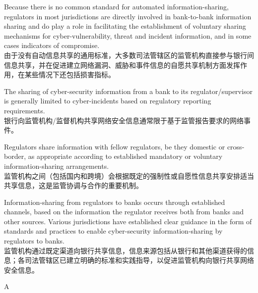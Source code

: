 \documentclass{article}
\begin{document}
\begin{choices}
    \item Because there is no common standard for automated information-sharing, regulators in most jurisdictions are directly involved in bank-to-bank information sharing and do play a role in facilitating the establishment of voluntary sharing mechanisms for cyber-vulnerability, threat and incident information, and in some cases indicators of compromise.\\由于没有自动信息共享的通用标准，大多数司法管辖区的监管机构直接参与银行间信息共享，并在促进建立网络漏洞、威胁和事件信息的自愿共享机制方面发挥作用，在某些情况下还包括损害指标。
    \item The sharing of cyber-security information from a bank to its regulator/supervisor is generally limited to cyber-incidents based on regulatory reporting requirements.\\银行向监管机构/监督机构共享网络安全信息通常限于基于监管报告要求的网络事件。
    \item Regulators share information with fellow regulators, be they domestic or cross-border, as appropriate according to established mandatory or voluntary information-sharing arrangements.\\监管机构之间（包括国内和跨境）会根据既定的强制性或自愿性信息共享安排适当共享信息，这是监管协调与合作的重要机制。
    \item Information-sharing from regulators to banks occurs through established channels, based on the information the regulator receives both from banks and other sources. Various jurisdictions have established clear guidance in the form of standards and practices to enable cyber-security information-sharing by regulators to banks.\\监管机构通过既定渠道向银行共享信息，信息来源包括从银行和其他渠道获得的信息；各司法管辖区已建立明确的标准和实践指导，以促进监管机构向银行共享网络安全信息。
\end{choices}

\begin{correctanswer}
    A
\end{correctanswer}
\end{document}
